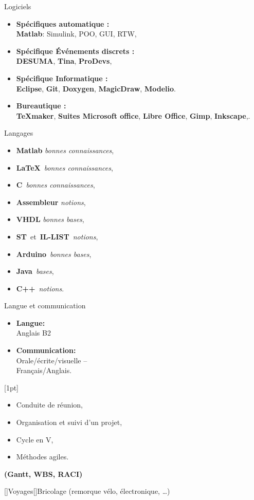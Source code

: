 \documentclass[11pt,a4paper,sans]{moderncv}        %
\newcommand{\myitem}{\textbullet}
\begin{document}
\vspace{4mm}

\tripleitemiseavecTitre%
{Logiciels}%
{{%
	\begin{itemize}[label=\myitem]
		\item \textbf{Spécifiques automatique :}\\%
\textbf{Matlab}: Simulink, POO, GUI, RTW, 
		\item \textbf{Spécifique Événements discrets :}\\%
\textbf{DESUMA}, \textbf{Tina}, \textbf{ProDevs}, 
		\item \textbf{Spécifique Informatique :}\\%
 \textbf{Eclipse}, \textbf{Git}, \textbf{Doxygen}, \textbf{MagicDraw}, \textbf{Modelio}.
		\item \textbf{Bureautique :} \\%
\textbf{\TeX maker}, \textbf{Suites Microsoft office}, \textbf{Libre Office}, \textbf{Gimp}, \textbf{Inkscape},.
	\end{itemize}
}}%
{Langages}%
{%
	\begin{itemize}[label=\myitem]
		\item \textbf{Matlab} \textit{bonnes connaissances}, 
		\item \textbf{\LaTeX}~\textit{bonnes connaissances}, 
		\item \textbf{C}~\textit{bonnes connaissances},
		\item \textbf{Assembleur} \textit{notions}, 
		\item \textbf{VHDL} \textit{bonnes bases}, 
		\item \textbf{ST}~et~\textbf{IL-LIST}~\textit{notions}, 
		\item \textbf{Arduino}~\textit{bonnes bases}, 
		\item \textbf{Java}~\textit{bases}, 
		\item \textbf{C++}~\textit{notions}.%
	\end{itemize}
}%
{Langue et communication}%
{{%
	\begin{itemize}[label=\myitem]%
	\item \textbf{Langue: } \\ Anglais B2%
	\item \textbf{Communication: } \\ Orale/écrite/visuelle -- \\Français/Anglais. %
	\end{itemize}%
	\vspace{2mm}
	\noindent{}[1pt]\vspace{0mm}
\begin{itemize}[label=\myitem]%
\item Conduite de réunion,
\item Organisation et suivi d'un projet,
\item Cycle en V,
\item Méthodes agiles.
\end{itemize}
	\textbf{(Gantt, WBS, RACI)}%
}}
\vspace{4mm}
\vspace{2mm}

[\bcfleur]{Voyages}[\bcvelo]{Bricolage (remorque vélo, électronique, …)}
%
\end{document}

